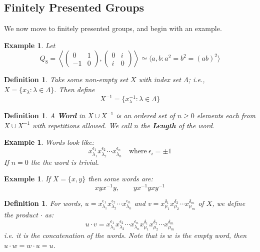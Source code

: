 \documentclass[a4paper,10pt]{article}
\newtheorem{Def}[thm]{Definition}
\newtheorem{eg}[thm]{Example}
\begin{document}
\subsection{Finitely Presented Groups}
We now move to finitely presented groups, and begin with an example.
\begin{eg}
Let 
\[ Q_8 = \left\langle \begin{pmatrix} 0 & 1 \\ -1 & 0 \end{pmatrix} , \begin{pmatrix} 0 & i \\ i & 0 \end{pmatrix} \right\rangle \simeq \langle a, b : a^2 = b^2 = (ab)^2 \rangle \]
\end{eg}

\begin{Def}
Take some non-empty set $X$ with index set $\Lambda$; i.e., $X = \{ x_\lambda : \lambda \in \Lambda \}$. Then define
\[ X^{-1} = \{ x_\lambda^{-1} : \lambda \in \Lambda \} \] 
\end{Def}

\begin{Def}
A \textbf{Word} in $X \cup X^{-1}$ is an ordered set of $n\geq 0$ elements each from $X \cup X^{-1}$ with repetitions allowed. We call $n$ the \textbf{Length} of the word.
\end{Def}

\begin{eg}
Words look like:
\[ x_{\lambda_1}^{\epsilon_1} x_{\lambda_2}^{\epsilon_2} \cdots x_{\lambda_n}^{\epsilon_n} \quad \text{where} \ \epsilon_i = \pm 1 \]
If $n = 0$ the the word is trivial. 
\end{eg}

\begin{eg}
If $X = \{ x , y\}$ then some words are:
\[ xyx^{-1}y, \qquad yx^{-1}yxy^{-1} \]
\end{eg}

\begin{Def}
For words, $u = x_{\lambda_1}^{\epsilon_1} x_{\lambda_2}^{\epsilon_2} \cdots x_{\lambda_n}^{\epsilon_n}$ and $v = x_{\mu_1}^{\delta_1} x_{\mu_2}^{\delta_2} \cdots x_{\mu_m}^{\delta_m}$ of $X$, we define the product $\cdot$ as:
\[ u \cdot v =  x_{\lambda_1}^{\epsilon_1} x_{\lambda_2}^{\epsilon_2} \cdots x_{\lambda_n}^{\epsilon_n} x_{\mu_1}^{\delta_1} x_{\mu_2}^{\delta_2} \cdots x_{\mu_m}^{\delta_m} \]
i.e. it is the concatenation of the words. Note that is $w$ is the empty word, then $u \cdot w = w \cdot u = u$. 
\end{Def}
\end{document}
